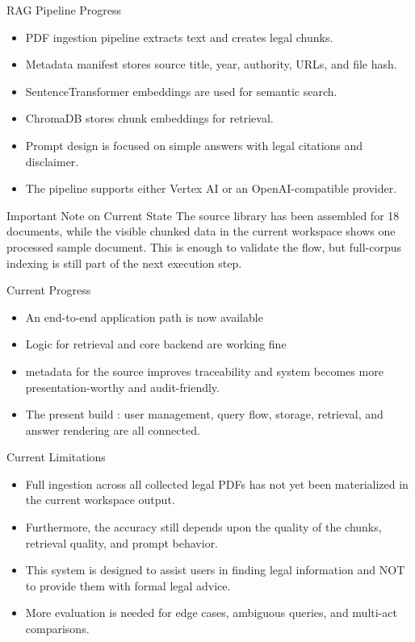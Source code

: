 \documentclass[aspectratio=169]{beamer}
\begin{document}
\begin{frame}{RAG Pipeline Progress}
  \begin{itemize}
    \item PDF ingestion pipeline extracts text and creates legal chunks.
    \item Metadata manifest stores source title, year, authority, URLs, and file hash.
    \item SentenceTransformer embeddings are used for semantic search.
    \item ChromaDB stores chunk embeddings for retrieval.
    \item Prompt design is focused on simple answers with legal citations and disclaimer.
    \item The pipeline supports either Vertex AI or an OpenAI-compatible provider.
  \end{itemize}

  \vspace{0.4em}
  \begin{block}{Important Note on Current State}
    The source library has been assembled for 18 documents, while the visible chunked data in the current workspace shows one processed sample document. This is enough to validate the flow, but full-corpus indexing is still part of the next execution step.
  \end{block}
\end{frame}

\begin{frame}{Current Progress}
  \begin{itemize}
    \item An end-to-end application path is now available
    \item Logic for retrieval and core backend  are working fine
    \item metadata for the source improves traceability and system becomes more presentation-worthy and audit-friendly.
    \item The present build : user management, query flow, storage, retrieval, and answer rendering are all connected.
  \end{itemize}
\end{frame}

\begin{frame}{Current Limitations}
  \begin{itemize}
    \item Full ingestion across all collected legal PDFs has not yet been materialized in the current workspace output.
    \item Furthermore, the accuracy still depends upon the quality of the chunks, retrieval quality, and prompt behavior.
    \item This system is designed to assist users in finding legal information and NOT to provide them with formal legal advice.
    \item More evaluation is needed for edge cases, ambiguous queries, and multi-act comparisons.
  \end{itemize}
\end{frame}
\end{document}

